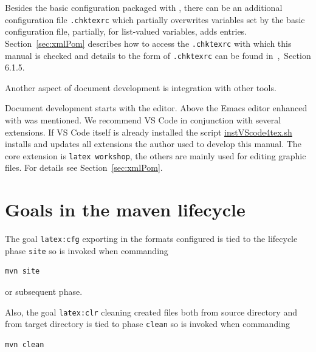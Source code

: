 Besides the basic configuration packaged with , 
there can be an additional configuration file \texttt{.chktexrc} 
which partially overwrites variables set by the basic configuration file, 
partially, for list-valued variables, adds entries. 
Section~\ref{sec:xmlPom} describes how to access the \texttt{.chktexrc} 
with which this manual is checked and 
details to the form of \texttt{.chktexrc} can be found in~\cite{ChkTeX22},~Section 6.1.5.  





Another aspect of document development is integration with other tools. 

Document development starts with the editor. 
Above the Emacs editor enhanced with \auctex{} was mentioned. 
We recommend VS Code in conjunction with several extensions. 
If VS Code itself is already installed 
the script \href{\urlSite fromMain/instVScode4tex}{instVScode4tex.sh} 
installs and updates all extensions 
the author used to develop this manual. 
The core extension is \texttt{latex workshop}, 
the others are mainly used for editing graphic files. 
For details see Section~\ref{sec:xmlPom}. 








\section{Goals in the maven lifecycle}\label{sec:usageLifecycle}

The goal \texttt{latex:cfg} exporting in the formats configured
is tied to the lifecycle phase \texttt{site} so is invoked
when commanding
%
\begin{Verbatim}[fontsize=\scriptsize]
mvn site
\end{Verbatim}
%
or subsequent phase.

Also, the goal \texttt{latex:clr} cleaning created files
both from source directory and from target directory
is tied to phase \texttt{clean} so is invoked
when commanding
%
\begin{Verbatim}[fontsize=\scriptsize]
mvn clean
\end{Verbatim}

